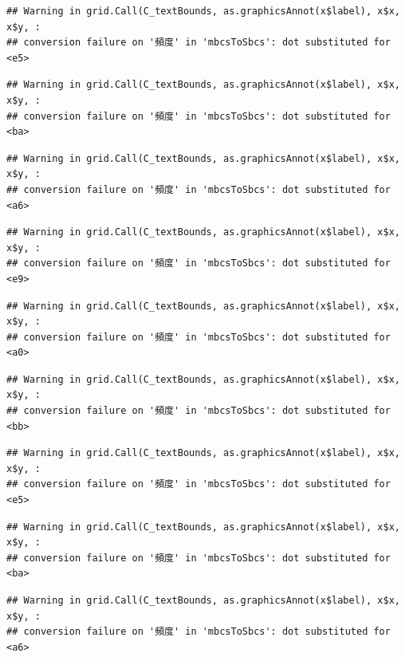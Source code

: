 \documentclass[
]{book}
\begin{document}
\begin{verbatim}
## Warning in grid.Call(C_textBounds, as.graphicsAnnot(x$label), x$x, x$y, :
## conversion failure on '頻度' in 'mbcsToSbcs': dot substituted for <e5>
\end{verbatim}

\begin{verbatim}
## Warning in grid.Call(C_textBounds, as.graphicsAnnot(x$label), x$x, x$y, :
## conversion failure on '頻度' in 'mbcsToSbcs': dot substituted for <ba>
\end{verbatim}

\begin{verbatim}
## Warning in grid.Call(C_textBounds, as.graphicsAnnot(x$label), x$x, x$y, :
## conversion failure on '頻度' in 'mbcsToSbcs': dot substituted for <a6>
\end{verbatim}

\begin{verbatim}
## Warning in grid.Call(C_textBounds, as.graphicsAnnot(x$label), x$x, x$y, :
## conversion failure on '頻度' in 'mbcsToSbcs': dot substituted for <e9>
\end{verbatim}

\begin{verbatim}
## Warning in grid.Call(C_textBounds, as.graphicsAnnot(x$label), x$x, x$y, :
## conversion failure on '頻度' in 'mbcsToSbcs': dot substituted for <a0>
\end{verbatim}

\begin{verbatim}
## Warning in grid.Call(C_textBounds, as.graphicsAnnot(x$label), x$x, x$y, :
## conversion failure on '頻度' in 'mbcsToSbcs': dot substituted for <bb>
\end{verbatim}

\begin{verbatim}
## Warning in grid.Call(C_textBounds, as.graphicsAnnot(x$label), x$x, x$y, :
## conversion failure on '頻度' in 'mbcsToSbcs': dot substituted for <e5>
\end{verbatim}

\begin{verbatim}
## Warning in grid.Call(C_textBounds, as.graphicsAnnot(x$label), x$x, x$y, :
## conversion failure on '頻度' in 'mbcsToSbcs': dot substituted for <ba>
\end{verbatim}

\begin{verbatim}
## Warning in grid.Call(C_textBounds, as.graphicsAnnot(x$label), x$x, x$y, :
## conversion failure on '頻度' in 'mbcsToSbcs': dot substituted for <a6>
\end{verbatim}
\end{document}
